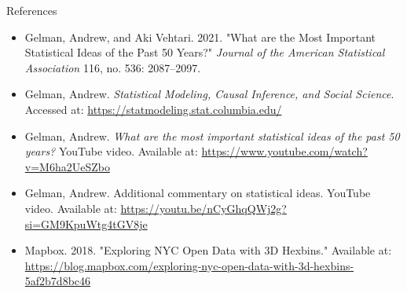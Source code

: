 \documentclass{beamer}
\begin{document}
\begin{frame}{References}
\begin{itemize}
    \item Gelman, Andrew, and Aki Vehtari. 2021. "What are the Most Important Statistical Ideas of the Past 50 Years?" 
    \textit{Journal of the American Statistical Association} 116, no. 536: 2087–2097.
    \item Gelman, Andrew. \textit{Statistical Modeling, Causal Inference, and Social Science}. Accessed at: \url{https://statmodeling.stat.columbia.edu/}
    \item Gelman, Andrew. \textit{What are the most important statistical ideas of the past 50 years?} YouTube video. Available at: \url{https://www.youtube.com/watch?v=M6ha2UeSZbo}
    \item Gelman, Andrew. Additional commentary on statistical ideas. YouTube video. Available at: \url{https://youtu.be/nCyGhqQWj2g?si=GM9KpuWtg4tGV8je}
    \item Mapbox. 2018. "Exploring NYC Open Data with 3D Hexbins." Available at: \url{https://blog.mapbox.com/exploring-nyc-open-data-with-3d-hexbins-5af2b7d8bc46}
\end{itemize}
\end{frame}
\end{document}
